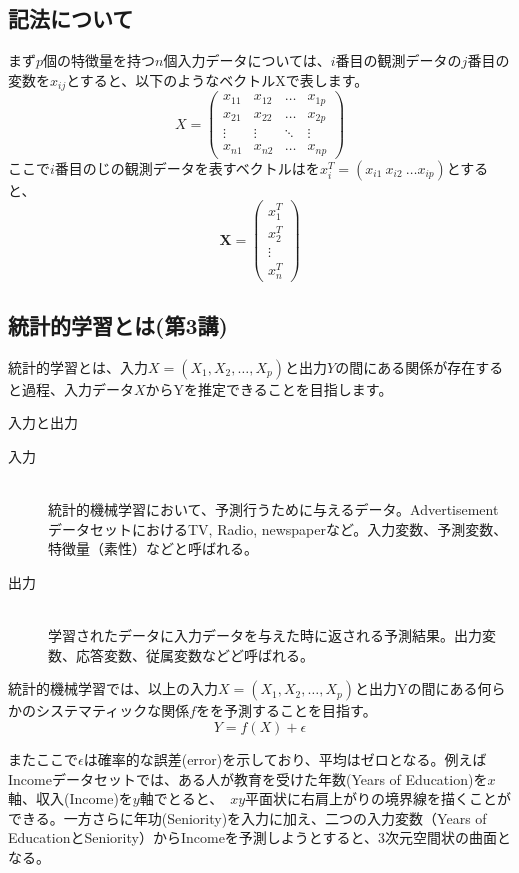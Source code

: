 \documentclass[uplatex]{jsarticle}
\begin{document}
\subsection{記法について}
まず$p$個の特徴量を持つ$n$個入力データについては、$i$番目の観測データの$j$番目の変数を$x_{ij}$とすると、以下のようなベクトルXで表します。
\[
  X = \left(
    \begin{array}{cccc}
      x_{11} & x_{12} & \ldots & x_{1p} \\
      x_{21} & x_{22} & \ldots & x_{2p} \\
      \vdots & \vdots & \ddots & \vdots \\
      x_{n1} & x_{n2} & \ldots & x_{np}
    \end{array}
  \right)
\]
ここで$i$番目のじの観測データを表すベクトルはを$x_i^T = (x_{i1} \ x_{i2} \ \ldots x_{ip})$とすると、
\[
  \bm{X} = \left(
    \begin{array}{c}
      x_1^T \\
      x_2^T\\
      \vdots \\
      x_n^T
    \end{array}
  \right)
\]
\subsection{統計的学習とは(第3講)}
統計的学習とは、入力$X = (X_1, X_2, \ldots, X_p)$と出力$Y$の間にある関係が存在すると過程、入力データ$X$からYを推定できることを目指します。
\begin{itembox}[l]{入力と出力}
  \begin{description}
    \item[入力]\mbox{}\\
    統計的機械学習において、予測行うために与えるデータ。AdvertisementデータセットにおけるTV, Radio, newspaperなど。入力変数、予測変数、特徴量（素性）などと呼ばれる。
    \item[出力]\mbox{}\\
    学習されたデータに入力データを与えた時に返される予測結果。出力変数、応答変数、従属変数などど呼ばれる。
  \end{description}
  統計的機械学習では、以上の入力$X = (X_1, X_2, \dots , X_p)$と出力Yの間にある何らかのシステマティックな関係$f$をを予測することを目指す。
  $$Y = f(X) + \epsilon$$

\end{itembox}

またここで$\epsilon$は確率的な誤差(error)を示しており、平均はゼロとなる。例えばIncomeデータセットでは、ある人が教育を受けた年数(Years of Education)を$x$軸、収入(Income)を$y$軸でとると、\
$xy$平面状に右肩上がりの境界線を描くことができる。一方さらに年功(Seniority)を入力に加え、二つの入力変数（Years of EducationとSeniority）からIncomeを予測しようとすると、3次元空間状の曲面となる。\
\end{document}
